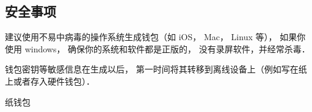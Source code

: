 
\subsection{安全事项}
建议使用不易中病毒的操作系统生成钱包（如 iOS， Mac， Linux 等）， 如果你使用 windows， 确保你的系统和软件都是正版的， 没有录屏软件，并经常杀毒．

钱包密钥等敏感信息在生成以后， 第一时间将其转移到离线设备上（例如写在纸上或者存入硬件钱包）．

纸钱包

